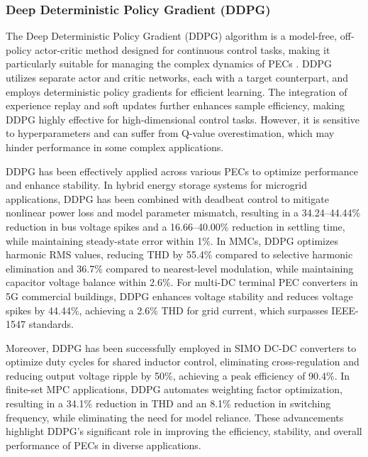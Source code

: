 \subsubsection{Deep Deterministic Policy Gradient (DDPG)}  

The Deep Deterministic Policy Gradient (DDPG) algorithm is a model-free, off-policy actor-critic method designed for continuous control tasks, making it particularly suitable for managing the complex dynamics of PECs \cite{lillicrap2015continuous}. DDPG utilizes separate actor and critic networks, each with a target counterpart, and employs deterministic policy gradients for efficient learning. The integration of experience replay and soft updates further enhances sample efficiency, making DDPG highly effective for high-dimensional control tasks. However, it is sensitive to hyperparameters and can suffer from Q-value overestimation, which may hinder performance in some complex applications.

DDPG has been effectively applied across various PECs to optimize performance and enhance stability. In hybrid energy storage systems for microgrid applications, DDPG has been combined with deadbeat control to mitigate nonlinear power loss and model parameter mismatch, resulting in a 34.24–44.44\% reduction in bus voltage spikes and a 16.66–40.00\% reduction in settling time, while maintaining steady-state error within 1\%. In MMCs, DDPG optimizes harmonic RMS values, reducing THD by 55.4\% compared to selective harmonic elimination and 36.7\% compared to nearest-level modulation, while maintaining capacitor voltage balance within 2.6\%. For multi-DC terminal PEC converters in 5G commercial buildings, DDPG enhances voltage stability and reduces voltage spikes by 44.44\%, achieving a 2.6\% THD for grid current, which surpasses IEEE-1547 standards.

Moreover, DDPG has been successfully employed in SIMO DC-DC converters to optimize duty cycles for shared inductor control, eliminating cross-regulation and reducing output voltage ripple by 50\%, achieving a peak efficiency of 90.4\%. In finite-set MPC applications, DDPG automates weighting factor optimization, resulting in a 34.1\% reduction in THD and an 8.1\% reduction in switching frequency, while eliminating the need for model reliance. These advancements highlight DDPG's significant role in improving the efficiency, stability, and overall performance of PECs in diverse applications.

